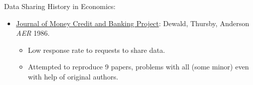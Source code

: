 \documentclass{beamer}
\begin{document}
\begin{frame}{Data Sharing}
History in Economics:
\begin{itemize}
\item  \href{http://www.jstor.org/stable/1806061}{Journal of Money Credit and Banking Project}: Dewald, Thursby, Anderson \textit{AER} 1986. 
\begin{itemize}
\item Low response rate to requests to share data.
\item Attempted to reproduce 9 papers, problems with all (some minor) even with help of original authors.
\end{itemize}
\end{itemize}
\end{frame}


{ %
    \begin{frame}[plain, label=AEAreg]
     \end{frame}
    
    
    \begin{frame}[plain]
     \end{frame}
}
\end{document}
